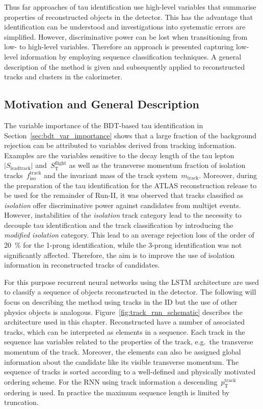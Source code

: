 Thus far approaches of tau identification use high-level variables that
summarise properties of reconstructed objects in the detector. This has the
advantage that identification can be understood and investigations into
systematic errors are simplified. However, discriminative power can be lost when
transitioning from low- to high-level variables. Therefore an approach is
presented capturing low-level information by employing sequence classification
techniques. A general description of the method is given and subsequently
applied to reconstructed tracks and clusters in the calorimeter.

\subsection{Motivation and General Description}
\label{sec:rnn_descr}

The variable importance of the BDT-based tau identification in
Section~\ref{sec:bdt_var_importance} shows that a large fraction of the
background rejection can be attributed to variables derived from tracking
information. Examples are the variables sensitive to the decay length of the tau
lepton~$|S_\text{leadtrack}|$ and~$S_\text{T}^\text{flight}$ as well as the
transverse momentum fraction of isolation tracks~$f_\text{iso}^\text{track}$ and
the invariant mass of the track system~$m_\text{track}$. Moreover, during the
preparation of the tau identification for the ATLAS reconstruction release to be
used for the remainder of Run-II, it was observed that tracks classified as
\emph{isolation} offer discriminative power against \tauhadvis candidates from
multijet events. However, instabilities of the \emph{isolation} track category
lead to the necessity to decouple tau identification and the track
classification by introducing the \emph{modified isolation} category. This lead
to an average rejection loss of the order of \SI{20}{\percent} for the 1-prong
identification, while the 3-prong identification was not significantly affected.
Therefore, the aim is to improve the use of isolation information in
reconstructed tracks of \tauhadvis candidates.

For this purpose recurrent neural networks using the LSTM architecture are used
to classify a sequence of objects reconstructed in the detector. The following
will focus on describing the method using tracks in the ID but the use of other
physics objects is analogous. Figure~\ref{fig:track_rnn_schematic} describes the
architecture used in this chapter. Reconstructed \tauhadvis have a number of
associated tracks, which can be interpreted as elements in a sequence. Each
track in the sequence has variables related to the properties of the track,
e.g.\ the transverse momentum of the track. Moreover, the elements can also be
assigned global information about the \tauhadvis candidate like its visible
transverse momentum. The sequence of tracks is sorted according to a
well-defined and physically motivated ordering scheme. For the RNN using track
information a descending~$p_\text{T}^\text{track}$ ordering is used. In practice
the maximum sequence length is limited by truncation.

